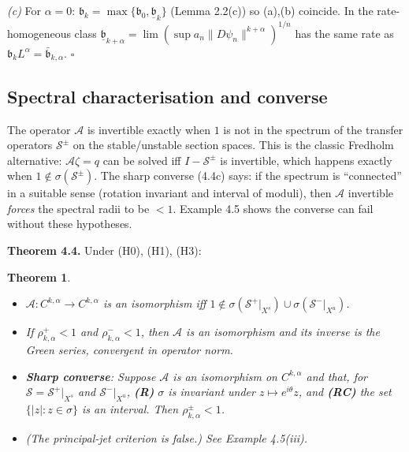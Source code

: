 \documentclass[11pt,a4paper]{article}
\theoremstyle{plain}
\newtheorem{theorem}{Theorem}[section]
\theoremstyle{definition}
\theoremstyle{remark}
\numberwithin{equation}{section}
\numberwithin{figure}{section}
\begin{document}
\textit{(c)} For $\alpha=0$: $\mathfrak b_k=\max\{\mathfrak b_0,\underline{\mathfrak b}_k\}$ (Lemma 2.2(c)) so (a),(b) coincide. In the rate-homogeneous class $\underline{\mathfrak b}_{k+\alpha}=\lim(\sup a_n\|D\psi_n\|^{k+\alpha})^{1/n}$ has the same rate as $\mathfrak b_kL^\alpha=\bar{\mathfrak b}_{k,\alpha}$. $\square$

\subsection{Spectral characterisation and converse}

The operator $\mathcal A$ is invertible exactly when $1$ is not in the spectrum of the transfer operators $\mathcal S^\pm$ on the stable/unstable section spaces. This is the classic Fredholm alternative: $\mathcal A\zeta=q$ can be solved iff $I-\mathcal S^\pm$ is invertible, which happens exactly when $1\notin\sigma(\mathcal S^\pm)$. The sharp converse (4.4c) says: if the spectrum is ``connected'' in a suitable sense (rotation invariant and interval of moduli), then $\mathcal A$ invertible \textit{forces} the spectral radii to be $<1$. Example 4.5 shows the converse can fail without these hypotheses.

\textbf{Theorem 4.4.} Under (H0), (H1), (H3):

\begin{theorem}
    \begin{itemize}
        \item[(a)] $\mathcal A:C^{k,\alpha}\to C^{k,\alpha}$ is an isomorphism iff $1\notin\sigma(\mathcal S^+|_{X^s})\cup\sigma(\mathcal S^-|_{X^u})$.
        \item[(b)] If $\rho^+_{k,\alpha}<1$ and $\rho^-_{k,\alpha}<1$, then $\mathcal A$ is an isomorphism and its inverse is the Green series, convergent in operator norm.
        \item[(c)] \textbf{Sharp converse}: Suppose $\mathcal A$ is an isomorphism on $C^{k,\alpha}$ and that, for $\mathcal S=\mathcal S^+|_{X^s}$ and $\mathcal S^-|_{X^u}$, \textbf{(R)} $\sigma$ is invariant under $z\mapsto e^{i\theta}z$, and \textbf{(RC)} the set $\{|z|:z\in\sigma\}$ is an interval. Then $\rho^\pm_{k,\alpha}<1$.
        \item[(d)] (The principal-jet criterion is false.) See Example 4.5(iii).
    \end{itemize}
\end{theorem}
\end{document}
